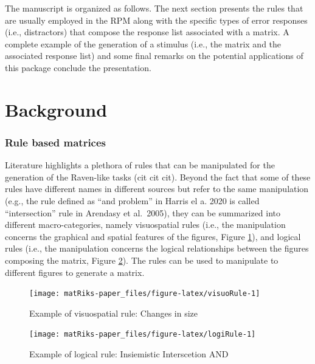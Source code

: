 The manuscript is organized as follows.
The next section presents the rules that are usually employed in the RPM along with the specific types of error responses (i.e., distractors) that compose the response list associated with a matrix.
A complete example of the generation of a stimulus (i.e., the matrix and the associated response list) and some final remarks on the potential applications of this package conclude the presentation.

\section{Background}\label{background}

\subsubsection{Rule based matrices}\label{rule-based-matrices}

Literature highlights a plethora of rules that can be manipulated for the generation of the Raven-like tasks (cit cit cit).
Beyond the fact that some of these rules have different names in different sources but refer to the same manipulation (e.g., the rule defined as ``and problem'' in Harris el a. 2020 is called ``intersection'' rule in Arendasy et al.~2005), they can be summarized into different macro-categories, namely visuospatial rules (i.e., the manipulation concerns the graphical and spatial features of the figures, Figure \ref{fig:visuoRule}), and logical rules (i.e., the manipulation concerns the logical relationships between the figures composing the matrix, Figure \ref{fig:logiRule}).
The rules can be used to manipulate to different figures to generate a matrix.

\begin{figure}

{\centering \texttt{[image: matRiks-paper\_files/figure-latex/visuoRule-1]} 

}

\caption{Example of visuospatial rule: Changes in size}\label{fig:visuoRule}
\end{figure}

\begin{figure}

{\centering \texttt{[image: matRiks-paper\_files/figure-latex/logiRule-1]} 

}

\caption{Example of logical rule: Insiemistic Interscetion AND}\label{fig:logiRule}
\end{figure}

